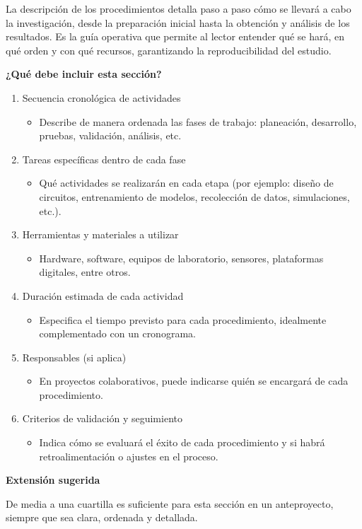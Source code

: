La descripción de los procedimientos detalla paso a paso cómo se llevará a cabo la investigación, desde la preparación inicial hasta la obtención y análisis de los resultados. Es la guía operativa que permite al lector entender qué se hará, en qué orden y con qué recursos, garantizando la reproducibilidad del estudio.

\textbf{¿Qué debe incluir esta sección?}

\begin{enumerate}
    \item Secuencia cronológica de actividades
    \begin{itemize}
        \item Describe de manera ordenada las fases de trabajo: planeación, desarrollo, pruebas, validación, análisis, etc.
    \end{itemize}
    \item Tareas específicas dentro de cada fase
    \begin{itemize}
        \item Qué actividades se realizarán en cada etapa (por ejemplo: diseño de circuitos, entrenamiento de modelos, recolección de datos, simulaciones, etc.).
    \end{itemize}
    \item Herramientas y materiales a utilizar
    \begin{itemize}
        \item Hardware, software, equipos de laboratorio, sensores, plataformas digitales, entre otros.
    \end{itemize}
    \item Duración estimada de cada actividad
    \begin{itemize}
        \item Especifica el tiempo previsto para cada procedimiento, idealmente complementado con un cronograma.
    \end{itemize}
    \item Responsables (si aplica)
    \begin{itemize}
        \item En proyectos colaborativos, puede indicarse quién se encargará de cada procedimiento.
    \end{itemize}
    \item Criterios de validación y seguimiento
    \begin{itemize}
        \item Indica cómo se evaluará el éxito de cada procedimiento y si habrá retroalimentación o ajustes en el proceso.
    \end{itemize}
\end{enumerate}

\textbf{Extensión sugerida}

De media a una cuartilla es suficiente para esta sección en un anteproyecto, siempre que sea clara, ordenada y detallada.